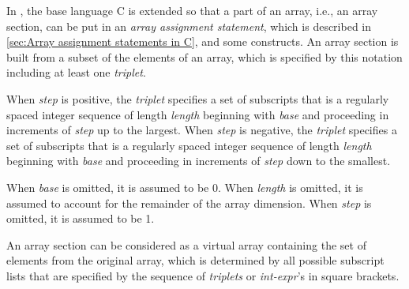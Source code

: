 In {\XMPC}, the base language C is extended so that a part of an array,
i.e., an array section, can be put in an {\it array assignment
statement}, which is described in \ref{sec:Array assignment statements
in C}, and some {\XMP} constructs. An array section is built from a
subset of the elements of an array, which is specified by this notation
including at least one {\it triplet}.

When {\it step} is positive, the {\it triplet} specifies a set of
subscripts that is a regularly spaced integer sequence of length {\it
length} beginning with {\it base} and proceeding in increments of {\it
step} up to the largest.
%
When {\it step} is negative, the {\it triplet} specifies a set of
subscripts that is a regularly spaced integer sequence of length {\it
length} beginning with {\it base} and proceeding in increments of {\it
step} down to the smallest.

When {\it base} is omitted, it is assumed to be 0. When {\it length}
is omitted, it is assumed to account for the remainder of the array
dimension. When {\it step} is omitted, it is assumed to be 1.

An array section can be considered as a virtual array containing the set
of elements from the original array, which is determined by all possible
subscript lists that are specified by the sequence of {\it triplets} or
{\it int-expr}'s in square brackets.



